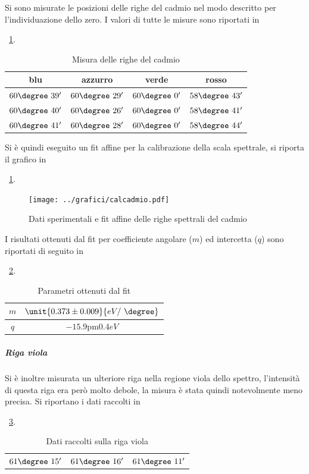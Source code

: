 \documentclass[a4paper,10pt]{article}
\begin{document}
Si sono misurate le posizioni delle righe del cadmio nel modo descritto per l'individuazione dello zero. I valori di tutte le misure sono riportati in \tablename{~\ref{tab:cadmio}.

\begin{table}[H]
	\centering
	\begin{tabular}{c|c|c|c}
	blu & azzurro & verde & rosso \\
	\hline
	$60\degree~39'$ & $60\degree~29'$ & $60\degree~0'$ & $58\degree~43'$\\
	$60\degree~40'$ & $60\degree~26'$ & $60\degree~0'$ & $58\degree~41'$\\
	$60\degree~41'$ & $60\degree~28'$ & $60\degree~0'$ & $58\degree~44'$\\
	\end{tabular}
	\caption{Misura delle righe del cadmio}
	\label{tab:cadmio}
\end{table}

Si è quindi eseguito un fit affine per la calibrazione della scala spettrale, si riporta il grafico in \figurename{~\ref{fig:cadmio}.

\begin{figure}[H]
	\centering
	\texttt{[image: ../grafici/calcadmio.pdf]}
	\caption{Dati sperimentali e fit affine delle righe spettrali del cadmio}
	\label{fig:cadmio}
\end{figure}

I risultati ottenuti dal fit per coefficiente angolare ($m$) ed intercetta ($q$) sono riportati di seguito in \tablename{~\ref{tab:calcadmio}.
	

\begin{table}[H]
	\centering
	\begin{tabular}{c|c}
		$m$ & $\unit{0.373 \pm 0.009}{eV/~\degree}$ \\
		\hline
		$q$ & $\unit{-15.9 \pm 0.4}{eV}$ \\
	\end{tabular}
	\caption{Parametri ottenuti dal fit}
	\label{tab:calcadmio}
\end{table}

\subparagraph{Riga viola} Si è inoltre misurata un ulteriore riga nella regione viola dello spettro, l'intensità di questa riga era però molto debole, la misura è stata quindi notevolmente meno precisa.
Si riportano i dati raccolti in \tablename{~\ref{tab:viola}.
	
\begin{table}[H]
	\centering
	\begin{tabular}{c|c|c}
		$61\degree~15'$  & $61\degree~16'$ & $61\degree~11'$\\
	\end{tabular}
	\caption{Dati raccolti sulla riga viola}
	\label{tab:viola}
\end{table}
	
}}}}
\end{document}
